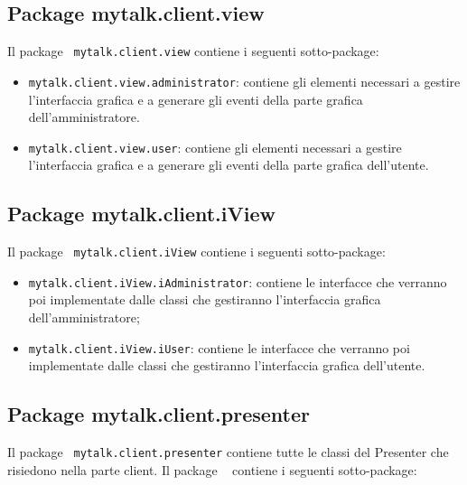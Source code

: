 \subsection{Package mytalk.client.view}
Il package\g~ \texttt{mytalk.client.view} contiene i seguenti sotto-package\g :
\begin{itemize}
	\item \texttt{mytalk.client.view.administrator}: contiene gli elementi necessari a gestire l'interfaccia grafica e a generare gli eventi della parte grafica dell'amministratore.
	\item \texttt{mytalk.client.view.user}: contiene gli elementi necessari a gestire l'interfaccia grafica e a generare gli eventi della parte grafica dell'utente.
\end{itemize} 

\subsection{Package mytalk.client.iView}
Il package\g~ \texttt{mytalk.client.iView} contiene i seguenti sotto-package\g :
\begin{itemize}
	\item \texttt{mytalk.client.iView.iAdministrator}: contiene le interfacce che verranno poi implementate dalle classi che gestiranno l'interfaccia grafica dell'amministratore;
	\item \texttt{mytalk.client.iView.iUser}: contiene le interfacce che verranno poi implementate dalle classi che gestiranno l'interfaccia grafica dell'utente.
\end{itemize} 

\subsection{Package mytalk.client.presenter}
Il package\g~ \texttt{mytalk.client.presenter} contiene tutte le classi del Presenter che risiedono nella parte client\g . Il package \g~ contiene i seguenti sotto-package\g:

